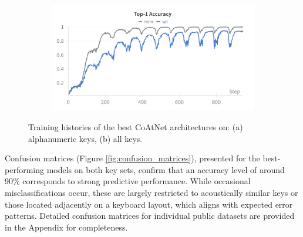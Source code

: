 \documentclass[a4paper,11pt,twoside]{report}
\theoremstyle{definition}
\begin{document}
\begin{figure}[h!]
\begin{subfigure}{\linewidth}
\begin{minipage}{0.49\linewidth}
    \end{minipage}
    \hfill
    \begin{minipage}{0.49\linewidth}
        \centering
        \includegraphics[width=\linewidth]{img_results/acc_all.png}
    \end{minipage}
    \caption{}
\end{subfigure}

\caption{Training histories of the best CoAtNet architectures on: (a) alphanumeric keys, (b) all keys.}
\label{fig:training_histories}
\end{figure}

Confusion matrices (Figure \ref{fig:confusion_matrices}), presented for the best-performing models on both key sets, confirm that an accuracy level of around 90\% corresponds to strong predictive performance. While occasional misclassifications occur, these are largely restricted to acoustically similar keys or those located adjacently on a keyboard layout, which aligns with expected error patterns. Detailed confusion matrices for individual public datasets are provided in the Appendix for completeness.
\end{document}
